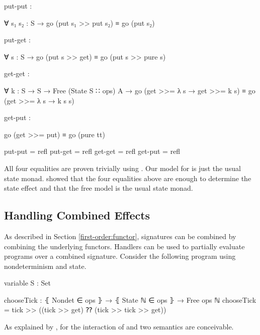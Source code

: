 \begin{code}[hide]
  put-put :
\end{code}
\begin{code}
    ∀ {s₁ s₂ : S} → go (put s₁ >> put s₂) ≡ go (put s₂)
\end{code}
\begin{code}[hide]
  put-get :
\end{code}
\begin{code}
    ∀ {s : S} → go (put s >> get) ≡ go (put s >> pure s)
\end{code}
\begin{code}[hide]
  get-get :
\end{code}
\begin{code}
    ∀ {k : S → S → Free (State S ∷ ops) A} →
      go (get >>= λ s → get >>= k s) ≡ go (get >>= λ s → k s s)
\end{code}
\begin{code}[hide]
  get-put :
\end{code}
\begin{code}
    go (get >>= put) ≡ go (pure tt)
\end{code}
\begin{code}[hide]
  put-put = refl
  put-get = refl
  get-get = refl
  get-put = refl
\end{code}
All four equalities are proven trivially using .
Our model for  is just the usual state monad.
\textcite{DBLP:conf/fossacs/PlotkinP02} showed that the four equalities above
are enough to determine the state effect and that the free model is the usual
state monad.


\subsection{Handling Combined Effects}
\label{first-order:combined-effects}

As described in Section \ref{first-order:functor}, signatures can be combined by
combining the underlying functors.
Handlers can be used to partially evaluate programs over a combined signature.
Consider the following program using nondeterminism and state.

\begin{code}[hide]
variable
  S : Set
\end{code}
\begin{code}
chooseTick : ⦃ Nondet ∈ ops ⦄ → ⦃ State ℕ ∈ ops ⦄ → Free ops ℕ
chooseTick = tick >> ((tick >> get) ⁇ (tick >> tick >> get))
\end{code}
As explained by \textcite{DBLP:conf/haskell/WuSH14}, for the interaction of
 and  two semantics are conceivable.
